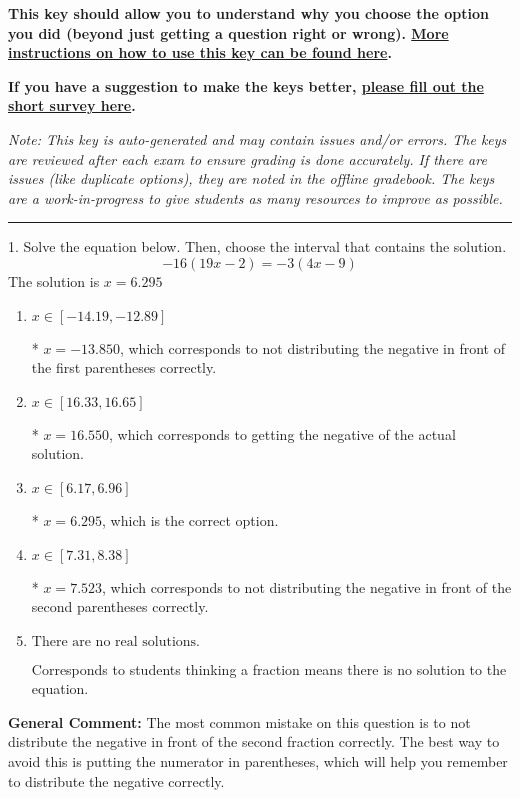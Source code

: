 \documentclass{extbook}[14pt]
\begin{document}
\textbf{This key should allow you to understand why you choose the option you did (beyond just getting a question right or wrong). \href{https://xronos.clas.ufl.edu/mac1105spring2020/courseDescriptionAndMisc/Exams/LearningFromResults}{More instructions on how to use this key can be found here}.}

\textbf{If you have a suggestion to make the keys better, \href{https://forms.gle/CZkbZmPbC9XALEE88}{please fill out the short survey here}.}

\textit{Note: This key is auto-generated and may contain issues and/or errors. The keys are reviewed after each exam to ensure grading is done accurately. If there are issues (like duplicate options), they are noted in the offline gradebook. The keys are a work-in-progress to give students as many resources to improve as possible.}

\rule{\textwidth}{0.4pt}

1. Solve the equation below. Then, choose the interval that contains the solution.
\[ -16(19x -2) = -3(4x -9) \] 
The solution is $ x = 6.295 $ 

\begin{enumerate}[label=\Alph*.] 
\item $ x \in [-14.19, -12.89] $ 

 * $x = -13.850$, which corresponds to not distributing the negative in front of the first parentheses correctly. 
\item $ x \in [16.33, 16.65] $ 

 * $x = 16.550$, which corresponds to getting the negative of the actual solution. 
\item $ x \in [6.17, 6.96] $ 

 * $x = 6.295$, which is the correct option. 
\item $ x \in [7.31, 8.38] $ 

 * $x = 7.523$, which corresponds to not distributing the negative in front of the second parentheses correctly. 
\item $ \text{There are no real solutions.} $ 

 Corresponds to students thinking a fraction means there is no solution to the equation. 
\end{enumerate} 
 
\textbf{General Comment:} The most common mistake on this question is to not distribute the negative in front of the second fraction correctly. The best way to avoid this is putting the numerator in parentheses, which will help you remember to distribute the negative correctly. 
\end{document}
